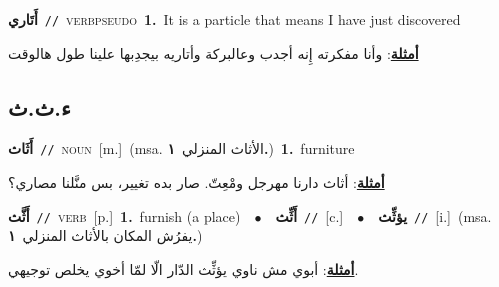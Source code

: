\documentclass[10pt,a4paper,twoside]{article} %
\begin{document}
\begin{multicols}{2}
{\setlength\topsep{0pt}\textbf{\foreignlanguage{arabic}{أَتَاري}}\ {\color{gray}\texttt{//}\color{black}}\ \textsc{verb\textunderscore pseudo}\ \textbf{1.}~It is a particle that means I have just discovered\  \begin{flushright}\color{gray}\foreignlanguage{arabic}{\textbf{\underline{\foreignlanguage{arabic}{أمثلة}}}: وأنا مفكرته إِنه أجدب وعالبركة وأتاريه بيجدِبها علينا طول هالوقت}\end{flushright}\color{black}} \vspace{2mm}

\vspace{-3mm}
\subsection*{\color{blue}\foreignlanguage{arabic}{ء.ث.ث}\color{blue}{}} 

{\setlength\topsep{0pt}\textbf{\foreignlanguage{arabic}{أَثَاث}}\ {\color{gray}\texttt{//}\color{black}}\ \textsc{noun}\ [m.]\ \color{gray}(msa. \foreignlanguage{arabic}{الأثاث المنزلي}~\foreignlanguage{arabic}{\textbf{١.}})\color{black}\ \textbf{1.}~furniture\  \begin{flushright}\color{gray}\foreignlanguage{arabic}{\textbf{\underline{\foreignlanguage{arabic}{أمثلة}}}: أثاث دارنا مهرجل ومْعِتّ. صار بده تغيير، بس منَّلنا مصاري؟}\end{flushright}\color{black}} \vspace{2mm}

{\setlength\topsep{0pt}\textbf{\foreignlanguage{arabic}{أَثَّث}}\ {\color{gray}\texttt{//}\color{black}}\ \textsc{verb}\ [p.]\ \textbf{1.}~furnish (a place)\ \ $\bullet$\ \ \setlength\topsep{0pt}\textbf{\foreignlanguage{arabic}{أَثِّث}}\ {\color{gray}\texttt{//}\color{black}}\ [c.]\ \ $\bullet$\ \ \setlength\topsep{0pt}\textbf{\foreignlanguage{arabic}{يؤثِّث}}\ {\color{gray}\texttt{//}\color{black}}\ [i.]\ \color{gray}(msa. \foreignlanguage{arabic}{يفرُش المكان بالأثاث المنزلي}~\foreignlanguage{arabic}{\textbf{١.}})\color{black}\  \begin{flushright}\color{gray}\foreignlanguage{arabic}{\textbf{\underline{\foreignlanguage{arabic}{أمثلة}}}: أبوي مش ناوي يؤثِّث الدّار الّا لمّا أخوي يخلص توجيهي.}\end{flushright}\color{black}} \vspace{2mm}


\end{multicols}
\end{document}
